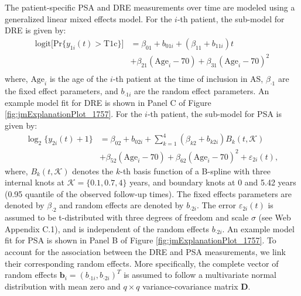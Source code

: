The patient-specific PSA and DRE measurements over time are modeled using a generalized linear mixed effects model. For the $i$-th patient, the sub-model for DRE is given by:
\begin{equation}
\label{eq:long_model_dre}
\begin{aligned}
    \mbox{logit} \big[\mbox{Pr}\{y_{1i}(t) > \mbox{T1c}\}\big] &= \beta_{01} + b_{01i} + (\beta_{11} + b_{11i}) t\\
    &+ \beta_{21} (\mbox{Age}_i-70) + \beta_{31} (\mbox{Age}_i-70)^2\\ 
    \end{aligned}
\end{equation}
where, $\mbox{Age}_i$ is the age of the $i$-th patient at the time of inclusion in AS, $\beta_{\cdot1}$ are the fixed effect parameters, and $b_{\cdot1i}$ are the random effect parameters. An example model fit for DRE is shown in Panel C of Figure \ref{fig:jmExplanationPlot_1757}. For the $i$-th patient, the sub-model for PSA is given by:
\begin{equation}
\label{eq:long_model_psa}
\begin{aligned}
    \log_2 \big\{y_{2i}(t) + 1\big\} &= \beta_{02} + b_{02i} + \sum_{k=1}^4 (\beta_{k2} + b_{k2i})  B_k(t,\mathcal{K})\\ 
    &+ \beta_{52} (\mbox{Age}_i-70) + \beta_{62} (\mbox{Age}_i-70)^2 + \varepsilon_{2i}(t),
    \end{aligned}
\end{equation}
where, $B_k(t, \mathcal{K})$ denotes the $k$-th basis function of a B-spline with three internal knots at $\mathcal{K} = \{0.1, 0.7, 4\}$ years, and boundary knots at 0 and 5.42 years (0.95 quantile of the observed follow-up times). The fixed effects parameters are denoted by $\beta_{\cdot2}$ and random effects are denoted by $b_{\cdot2i}$. The error $\varepsilon_{2i}(t)$ is assumed to be t-distributed with three degrees of freedom and scale $\sigma$ (see Web Appendix C.1), and is independent of the random effects $b_{\cdot2i}$. An example model fit for PSA is shown in Panel B of Figure \ref{fig:jmExplanationPlot_1757}. To account for the association between the DRE and PSA measurements, we link their corresponding random effects. More specifically, the complete vector of random effects $\boldsymbol{b}_i = (b_{\cdot1i}, b_{\cdot2i})^T$ is assumed to follow a multivariate normal distribution with mean zero and $q\times q$ variance-covariance matrix $\boldsymbol{D}$.


